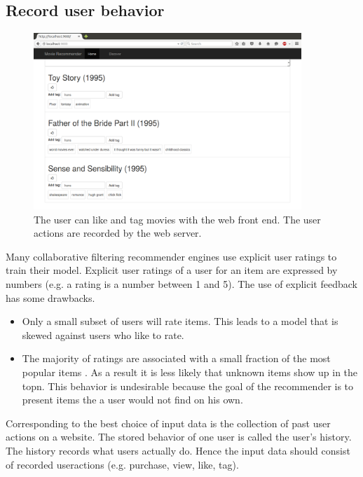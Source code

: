 \subsection{Record user behavior}
\label{sec:inputdata}

\begin{figure}
  \centering
     \includegraphics[width=0.9\textwidth]{collectinginput}
  \caption{The user can like and tag movies with the web front end. The user actions are recorded by the web server.}
  \label{fig:gui}
\end{figure}

Many collaborative filtering recommender engines use explicit user ratings to train their model. Explicit user ratings of a user for an item are expressed by numbers (e.g. a rating is a number between 1 and 5). The use of explicit feedback has some drawbacks.
\begin{itemize}
\item Only a small subset of users will rate items. This leads to a model that is skewed against users who like to rate.
\item The majority of ratings are associated with a small fraction of the most popular items \cite{Anderson}. As a result it is less likely that unknown items show up in the \gls{topn}. This behavior is undesirable because the goal of the recommender is to present items the a user would not find on his own.
\end{itemize}

Corresponding to \cite{Dunning14} the best choice of input data is the collection of past user actions on a website. The stored behavior of one user is called the user's \gls{history}. The history records what users actually do. Hence the input data should consist of recorded \glspl{useraction} (e.g. purchase, view, like, tag).

